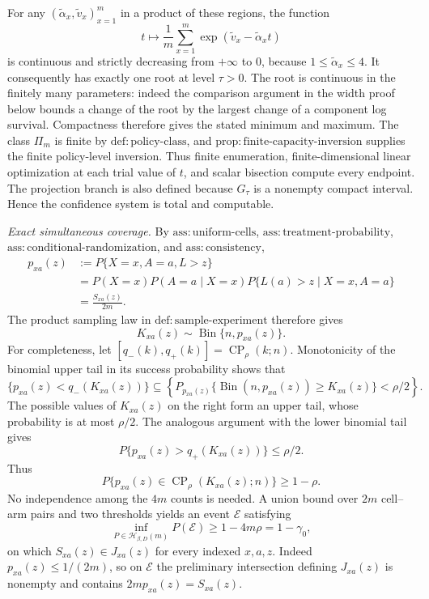 For any \((\widetilde\alpha_x,\widetilde v_x)_{x=1}^m\) in a product of these regions, the function
\[
 t\longmapsto \frac1m\sum_{x=1}^m
       \exp(\widetilde v_x-\widetilde\alpha_xt)
\]
is continuous and strictly decreasing from \(+\infty\) to \(0\), because \(1\leq\widetilde\alpha_x\leq4\).  It consequently has exactly one root at level \(\tau>0\).  The root is continuous in the finitely many parameters: indeed the comparison argument in the width proof below bounds a change of the root by the largest change of a component log survival.  Compactness therefore gives the stated minimum and maximum.  The class \(\Pi_m\) is finite by \(\mathrm{def{:}policy\text{-}class}\), and \(\mathrm{prop{:}finite\text{-}capacity\text{-}inversion}\) supplies the finite policy-level inversion.  Thus finite enumeration, finite-dimensional linear optimization at each trial value of \(t\), and scalar bisection compute every endpoint.  The projection branch is also defined because \(G_\tau\) is a nonempty compact interval.  Hence the confidence system is total and computable.

\emph{Exact simultaneous coverage.}  By \(\mathrm{ass{:}uniform\text{-}cells}\), \(\mathrm{ass{:}treatment\text{-}probability}\), \(\mathrm{ass{:}conditional\text{-}randomization}\), and \(\mathrm{ass{:}consistency}\),
\[
 \begin{aligned}
 p_{xa}(z)
 &:=P\{X=x,A=a,L>z\}\\
 &=P(X=x)P(A=a\mid X=x)
   P\{L(a)>z\mid X=x,A=a\}\\
 &=\frac{S_{xa}(z)}{2m}.
 \end{aligned}
\]
The product sampling law in \(\mathrm{def{:}sample\text{-}experiment}\) therefore gives
\[
 K_{xa}(z)\sim\operatorname{Bin}\{n,p_{xa}(z)\}.
\]
For completeness, let \([q_-(k),q_+(k)]=\operatorname{CP}_{\rho}(k;n)\).  Monotonicity of the binomial upper tail in its success probability shows that
\[
 \{p_{xa}(z)<q_-(K_{xa}(z))\}
 \subseteq
 \left\{P_{p_{xa}(z)}\{\operatorname{Bin}(n,p_{xa}(z))\geq K_{xa}(z)\}<\rho/2\right\}.
\]
The possible values of \(K_{xa}(z)\) on the right form an upper tail, whose probability is at most \(\rho/2\).  The analogous argument with the lower binomial tail gives
\[
 P\{p_{xa}(z)>q_+(K_{xa}(z))\}\leq\rho/2.
\]
Thus
\[
 P\{p_{xa}(z)\in\operatorname{CP}_{\rho}(K_{xa}(z);n)\}\geq1-\rho.
\]
No independence among the \(4m\) counts is needed.  A union bound over \(2m\) cell--arm pairs and two thresholds yields an event \(\mathcal E\) satisfying
\[
 \inf_{P\in\mathcal H_{\beta,D}(m)}P(\mathcal E)
 \geq 1-4m\rho=1-\gamma _0,
\]
on which \(S_{xa}(z)\in J_{xa}(z)\) for every indexed \(x,a,z\).  Indeed \(p_{xa}(z)\leq1/(2m)\), so on \(\mathcal E\) the preliminary intersection defining \(J_{xa}(z)\) is nonempty and contains \(2mp_{xa}(z)=S_{xa}(z)\).

